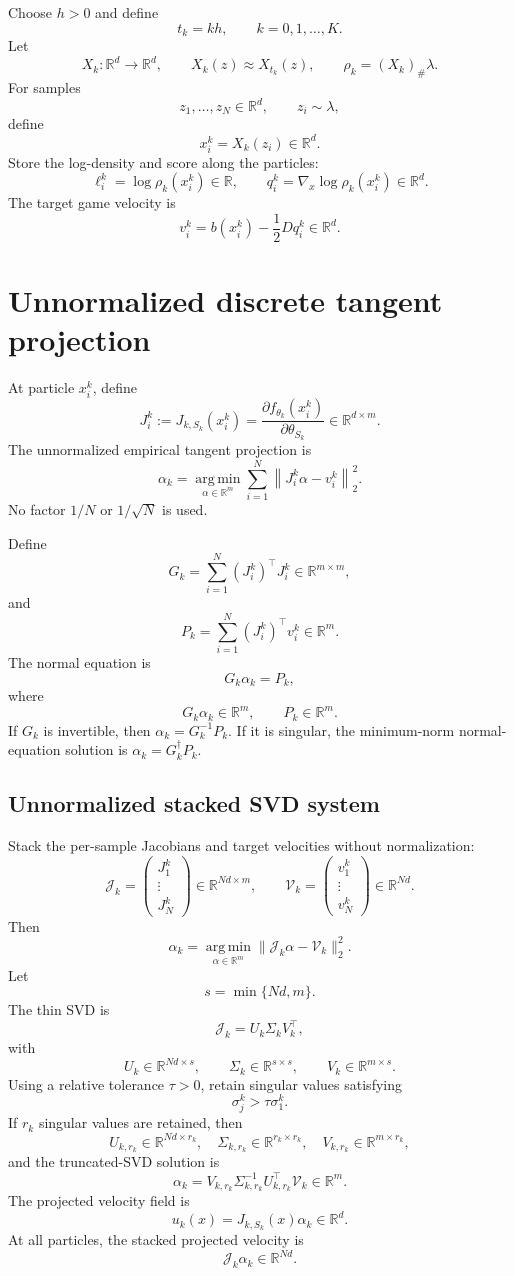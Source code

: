\documentclass[11pt]{article}
\newcommand{\R}{\mathbb{R}}
\newcommand{\argminop}{\operatorname*{arg\,min}}
\begin{document}
Choose $h>0$ and define
\[
t_k=kh,
\qquad
k=0,1,\ldots,K.
\]
Let
\[
X_k:\R^d\to\R^d,
\qquad
X_k(z)\approx X_{t_k}(z),
\qquad
\rho_k=(X_k)_{\#}\lambda.
\]
For samples
\[
z_1,\ldots,z_N\in\R^d,
\qquad
z_i\sim\lambda,
\]
define
\[
\boxed{
x_i^k=X_k(z_i)\in\R^d.
}
\]
Store the log-density and score along the particles:
\[
\boxed{
\ell_i^k=\log\rho_k(x_i^k)\in\R,
}
\qquad
\boxed{
q_i^k=\nabla_x\log\rho_k(x_i^k)\in\R^d.
}
\]
The target game velocity is
\[
\boxed{
v_i^k
=
b(x_i^k)-\frac12Dq_i^k
\in\R^d.
}
\]

\section{Unnormalized discrete tangent projection}

At particle $x_i^k$, define
\[
\boxed{
J_i^k
:=
J_{k,S_k}(x_i^k)
=
\frac{\partial f_{\theta_k}(x_i^k)}{\partial\theta_{S_k}}
\in\R^{d\times m}.
}
\]
The unnormalized empirical tangent projection is
\[
\boxed{
\alpha_k
=
\argminop_{\alpha\in\R^m}
\sum_{i=1}^N
\left\|J_i^k\alpha-v_i^k\right\|_2^2.
}
\]
No factor $1/N$ or $1/\sqrt N$ is used.

Define
\[
\boxed{
G_k
=
\sum_{i=1}^N(J_i^k)^\top J_i^k
\in\R^{m\times m},
}
\]
and
\[
\boxed{
P_k
=
\sum_{i=1}^N(J_i^k)^\top v_i^k
\in\R^m.
}
\]
The normal equation is
\[
\boxed{
G_k\alpha_k=P_k,
}
\]
where
\[
G_k\alpha_k\in\R^m,
\qquad
P_k\in\R^m.
\]
If $G_k$ is invertible, then $\alpha_k=G_k^{-1}P_k$. If it is singular, the minimum-norm normal-equation solution is $\alpha_k=G_k^\dagger P_k$.

\subsection{Unnormalized stacked SVD system}

Stack the per-sample Jacobians and target velocities without normalization:
\[
\boxed{
\mathcal J_k
=
\begin{pmatrix}
J_1^k\\
\vdots\\
J_N^k
\end{pmatrix}
\in\R^{Nd\times m},
}
\qquad
\boxed{
\mathcal V_k
=
\begin{pmatrix}
v_1^k\\
\vdots\\
v_N^k
\end{pmatrix}
\in\R^{Nd}.
}
\]
Then
\[
\alpha_k
=
\argminop_{\alpha\in\R^m}
\|\mathcal J_k\alpha-\mathcal V_k\|_2^2.
\]
Let
\[
s=\min\{Nd,m\}.
\]
The thin SVD is
\[
\boxed{
\mathcal J_k=U_k\Sigma_kV_k^\top,
}
\]
with
\[
U_k\in\R^{Nd\times s},
\qquad
\Sigma_k\in\R^{s\times s},
\qquad
V_k\in\R^{m\times s}.
\]
Using a relative tolerance $\tau>0$, retain singular values satisfying
\[
\sigma_j^k>\tau\sigma_1^k.
\]
If $r_k$ singular values are retained, then
\[
U_{k,r_k}\in\R^{Nd\times r_k},
\quad
\Sigma_{k,r_k}\in\R^{r_k\times r_k},
\quad
V_{k,r_k}\in\R^{m\times r_k},
\]
and the truncated-SVD solution is
\[
\boxed{
\alpha_k
=
V_{k,r_k}\Sigma_{k,r_k}^{-1}U_{k,r_k}^\top\mathcal V_k
\in\R^m.
}
\]
The projected velocity field is
\[
\boxed{
u_k(x)=J_{k,S_k}(x)\alpha_k\in\R^d.
}
\]
At all particles, the stacked projected velocity is
\[
\mathcal J_k\alpha_k\in\R^{Nd}.
\]
\end{document}
